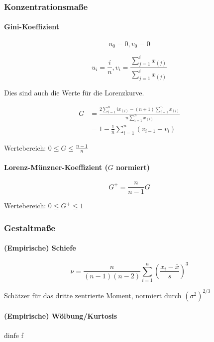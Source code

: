 \documentclass[10pt]{article}
\begin{document}
\subsubsection{Konzentrationsmaße}
\begin{multicols}{2}

\paragraph{Gini-Koeffizient}

$$u_0=0, v_0=0$$


$$u_i=\frac{i}{n}, v_i= \frac{\sum\limits_{j=1}^i x_{(j)}}{\sum\limits_{j=1}^i x_{(j)}}$$


\noindent Dies sind auch die Werte für die Lorenzkurve.

\begin{equation*} 
\begin{split}
G & = \frac{2\sum\limits_{i=1}^n ix_{(i)}-(n+1)\sum\limits_{i=1}^n x_{(i)}}{n\sum\limits_{i=1}^n x_{(i)}} \\ & = 1-\frac{1}{n}\sum\limits_{i=1}^n(v_{i-1}+v_i)
\end{split}
\end{equation*}

\indent Wertebereich: $ 0 \le G \le \frac{n-1}{n}$



\paragraph{Lorenz-Münzner-Koeffizient ($G$ normiert)}

$$G^+=\frac{n}{n-1}G$$

\indent Wertebereich: $ 0 \le G^+ \le 1$






\end{multicols}


\subsubsection{Gestaltmaße}

\begin{multicols}{2}
\paragraph{(Empirische) Schiefe}

$$\nu = \frac{n}{(n-1)(n-2)} \sum_{i=1}^n \left(\frac{x_i-\bar{x}}{s}\right)^3$$

\noindent Schätzer für das dritte zentrierte Moment, normiert durch $(\sigma^2)^{2/3}$

\paragraph{(Empirische) Wölbung/Kurtosis}
dinfe
f

\end{multicols}
\end{document}
